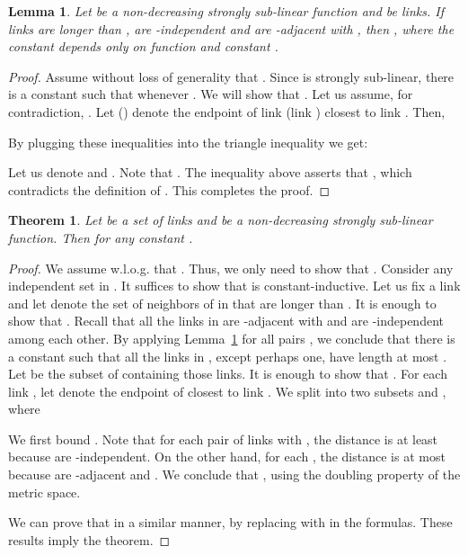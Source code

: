 \documentclass[11pt]{article}
\newtheorem{lemma}{Lemma}
\newtheorem{theorem}{Theorem}
\begin{document}
\begin{lemma}\label{L:shortneighbor}
Let  be a non-decreasing strongly sub-linear function and  be links. If links  are longer than , are -independent and are -adjacent with , then , where the constant  depends only on function  and constant .
\end{lemma}

\begin{proof}
Assume without loss of generality that .
Since  is strongly sub-linear, there is a constant  such that  whenever . We will show that . 
Let us assume, for contradiction, . Let  () denote the endpoint of link  (link ) closest to link . Then,

By plugging these inequalities into the triangle inequality we get:

Let us denote  and . Note that . The inequality above asserts that , which contradicts the definition of .  This completes the proof.
\end{proof}


\begin{theorem}\label{T:constantsens}
Let  be a set of links and  be a non-decreasing strongly sub-linear function. Then  for any constant .
\end{theorem}

	\begin{proof}
	We assume w.l.o.g. that . Thus, we only need to show that . Consider any independent set  in . It suffices to show that  is constant-inductive.  Let us fix a link  and let  denote the set of neighbors of  in  that are longer than . It is enough to show that . Recall that all the links in  are -adjacent with  and are -independent among each other. By applying Lemma~\ref{L:shortneighbor} for all pairs , we conclude that there is a constant  such that all the links in , except perhaps one, have length at most . Let  be the subset of  containing those links. It is enough to show that . For each link , let  denote the endpoint of  closest to link . We split  into two subsets  and , where
	
	We first bound . Note that for each pair of links  with , the distance  is at least  because  are -independent. On the other hand, for each , the distance  is at most  because  are -adjacent and . We conclude that , using the doubling property of the metric space.
	
	We can prove that  in a similar manner, by replacing  with  in the formulas. These results imply the theorem.
	\end{proof}
\end{document}
